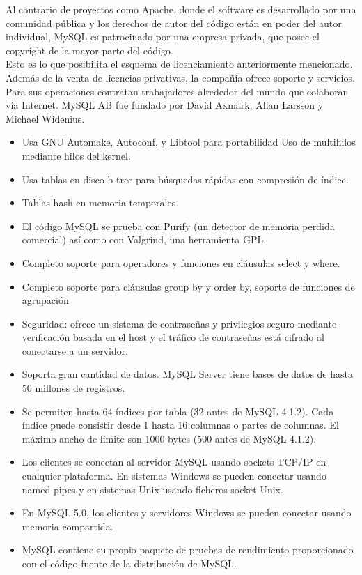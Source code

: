Al contrario de proyectos como Apache, donde el software es desarrollado por una comunidad pública y los derechos de autor del código están en poder del autor individual, MySQL es patrocinado por una empresa privada, que posee el copyright de la mayor parte del código.\\
Esto es lo que posibilita el esquema de licenciamiento anteriormente mencionado. Además de la venta de licencias privativas, la compañía ofrece soporte y servicios. Para sus operaciones contratan trabajadores alrededor del mundo que colaboran vía Internet. MySQL AB fue fundado por David Axmark, Allan Larsson y Michael Widenius.

\begin{itemize}
\item Usa GNU Automake, Autoconf, y Libtool para portabilidad
Uso de multihilos mediante hilos del kernel.
\item Usa tablas en disco b-tree para búsquedas rápidas con compresión de índice.
\item Tablas hash en memoria temporales.
\item El código MySQL se prueba con Purify (un detector de memoria perdida comercial) así como con Valgrind, una herramienta GPL.
\item Completo soporte para operadores y funciones en cláusulas select y where.
\item Completo soporte para cláusulas group by y order by, soporte de funciones de agrupación
\item Seguridad: ofrece un sistema de contraseñas y privilegios seguro mediante verificación basada en el host y el tráfico de contraseñas está cifrado al conectarse a un servidor.
\item Soporta gran cantidad de datos. MySQL Server tiene bases de datos de hasta 50 millones de registros.
\item Se permiten hasta 64 índices por tabla (32 antes de MySQL 4.1.2). Cada índice puede consistir desde 1 hasta 16 columnas o partes de columnas. El máximo ancho de límite son 1000 bytes (500 antes de MySQL 4.1.2).
\item Los clientes se conectan al servidor MySQL usando sockets TCP/IP en cualquier plataforma. En sistemas Windows se pueden conectar usando named pipes y en sistemas Unix usando ficheros socket Unix.
\item En MySQL 5.0, los clientes y servidores Windows se pueden conectar usando memoria compartida.
\item MySQL contiene su propio paquete de pruebas de rendimiento proporcionado con el código fuente de la distribución de MySQL.
\end{itemize}

